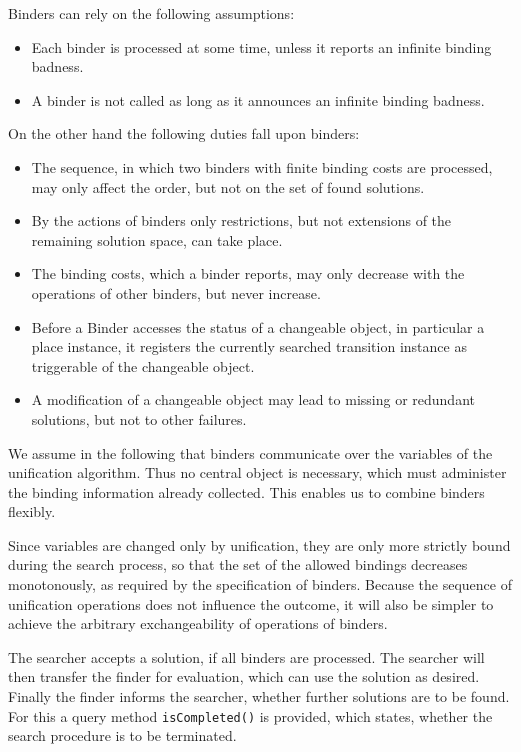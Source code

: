 Binders can rely on the following assumptions:
\begin{itemize}
\item Each binder is processed at some time, unless it reports an infinite 
  binding badness. 
\item A binder is not called as long as it announces an infinite
  binding badness. 
\end{itemize}
On the other hand the following duties fall upon binders: 
\begin{itemize}
\item The sequence, in which two binders with finite binding costs 
  are processed, may only affect the order, but not on the set of 
  found solutions. 
\item By the actions of binders only restrictions, but not extensions 
  of the remaining solution space, can take place. 
\item The binding costs, which a binder reports, 
  may only decrease with the operations of other binders, but never increase. 
\item Before a Binder accesses the status of a changeable object, 
  in particular a place instance, it registers the currently
  searched transition instance as triggerable of the changeable object.
\item A modification of a changeable object may lead to missing
  or redundant solutions, but not to other failures.
\end{itemize}

We assume in the following that binders communicate
over the variables of the unification algorithm. Thus no central 
object is necessary, which must administer the binding 
information already collected. This enables us to combine binders 
flexibly.

Since variables are changed only by unification, they are 
only more strictly bound during the search process, so that 
the set of the allowed bindings decreases monotonously, as 
required by the specification of binders.
Because the sequence of unification operations does not 
influence the outcome, it will also be simpler to achieve 
the arbitrary exchangeability of operations of binders.

The searcher accepts a solution, if all binders are processed. The 
searcher will then transfer the finder for evaluation, which can 
use the solution as desired. Finally the finder informs the searcher, 
whether further solutions are to be found. For this a query method 
\texttt{isCompleted()} is provided, which states, whether the 
search procedure is to be terminated.


